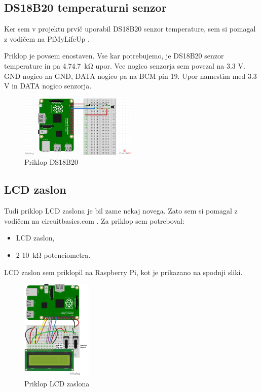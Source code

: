 \documentclass[11pt]{article}
\begin{document}
\subsection{DS18B20 temperaturni senzor}
Ker sem v projektu prvič uporabil DS18B20 senzor temperature, sem si pomagal z vodičem na PiMyLifeUp \cite{PiMyLifeUp_DS18B20}.

Priklop je povsem enostaven. Vse kar potrebujemo, je DS18B20 senzor temperature in pa 4.7\SI{4.7}{\kohm} upor. Vcc nogico senzorja sem povezal na 3.3 V. GND nogico na GND, DATA nogico pa na BCM pin 19. Upor namestim med 3.3 V in DATA nogico senzorja.
\begin{figure}[h]
\centering
\includegraphics[width=0.5\textwidth]{images/DS18B20_diagram.png}
\caption{Priklop DS18B20}
\end{figure}

\subsection{LCD zaslon}
Tudi priklop LCD zaslona je bil zame nekaj novega. Zato sem si pomagal z vodičem na circuitbasics.com \cite{CB_LCD}.
Za priklop sem potreboval:
\begin{itemize}
    \item LCD zaslon,
    \item 2 \SI{10}{\kohm} potenciometra.
\end{itemize}
LCD zaslon sem priklopil na Raspberry Pi, kot je prikazano na spodnji sliki.
\begin{figure}[h]
\centering
\includegraphics[width=0.3\textwidth]{images/LCD_4bit.png}
\caption{Priklop LCD zaslona}
\end{figure}
\newpage
\end{document}
